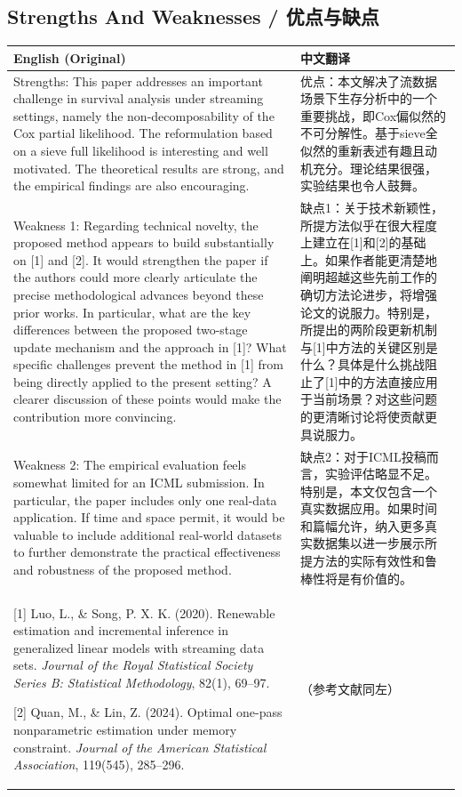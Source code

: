 \documentclass[10pt,a4paper]{article}
\begin{document}
\subsection{Strengths And Weaknesses / 优点与缺点}

\begin{longtable}{L{0.48\textwidth}|L{0.48\textwidth}}
\hline
\textbf{English (Original)} & \textbf{中文翻译} \\
\hline
Strengths: This paper addresses an important challenge in survival analysis under streaming settings, namely the non-decomposability of the Cox partial likelihood. The reformulation based on a sieve full likelihood is interesting and well motivated. The theoretical results are strong, and the empirical findings are also encouraging.
&
优点：本文解决了流数据场景下生存分析中的一个重要挑战，即Cox偏似然的不可分解性。基于sieve全似然的重新表述有趣且动机充分。理论结果很强，实验结果也令人鼓舞。 \\
\hline
Weakness 1: Regarding technical novelty, the proposed method appears to build substantially on [1] and [2]. It would strengthen the paper if the authors could more clearly articulate the precise methodological advances beyond these prior works. In particular, what are the key differences between the proposed two-stage update mechanism and the approach in [1]? What specific challenges prevent the method in [1] from being directly applied to the present setting? A clearer discussion of these points would make the contribution more convincing.
&
缺点1：关于技术新颖性，所提方法似乎在很大程度上建立在[1]和[2]的基础上。如果作者能更清楚地阐明超越这些先前工作的确切方法论进步，将增强论文的说服力。特别是，所提出的两阶段更新机制与[1]中方法的关键区别是什么？具体是什么挑战阻止了[1]中的方法直接应用于当前场景？对这些问题的更清晰讨论将使贡献更具说服力。 \\
\hline
Weakness 2: The empirical evaluation feels somewhat limited for an ICML submission. In particular, the paper includes only one real-data application. If time and space permit, it would be valuable to include additional real-world datasets to further demonstrate the practical effectiveness and robustness of the proposed method.
&
缺点2：对于ICML投稿而言，实验评估略显不足。特别是，本文仅包含一个真实数据应用。如果时间和篇幅允许，纳入更多真实数据集以进一步展示所提方法的实际有效性和鲁棒性将是有价值的。 \\
\hline
{[1] Luo, L., \& Song, P. X. K. (2020). Renewable estimation and incremental inference in generalized linear models with streaming data sets. \textit{Journal of the Royal Statistical Society Series B: Statistical Methodology}, 82(1), 69--97.}

{[2] Quan, M., \& Lin, Z. (2024). Optimal one-pass nonparametric estimation under memory constraint. \textit{Journal of the American Statistical Association}, 119(545), 285--296.}
&
（参考文献同左） \\
\hline
\end{longtable}
\end{document}
